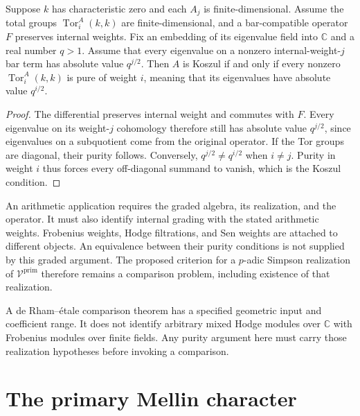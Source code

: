 \begin{theorem}
\label{v4-arith:thm:arithmetic-koszulness}
Suppose \(k\) has characteristic zero and each \(A_j\) is finite-dimensional.
Assume the total groups
\(\operatorname{Tor}^A_i(k,k)\) are finite-dimensional, and a
bar-compatible operator \(F\) preserves internal weights.
Fix an embedding of its eigenvalue field into \(\mathbb C\) and
a real number \(q>1\). Assume that every eigenvalue on a nonzero
internal-weight-\(j\) bar term has absolute value \(q^{j/2}\).
Then \(A\) is Koszul if and only if every nonzero
\(\operatorname{Tor}^A_i(k,k)\) is pure of weight \(i\), meaning
that its eigenvalues have absolute value \(q^{i/2}\).
\end{theorem}
\begin{proof}
The differential preserves internal weight and commutes with \(F\).
Every eigenvalue on its weight-\(j\) cohomology therefore still has
absolute value \(q^{j/2}\), since eigenvalues on a subquotient come
from the original operator. If the Tor groups are diagonal, their
purity follows. Conversely, \(q^{j/2}\ne q^{i/2}\) when \(i\ne j\).
Purity in weight \(i\) thus forces every off-diagonal summand to
vanish, which is the Koszul condition.
\end{proof}

An arithmetic application requires the graded algebra, its realization,
and the operator. It must also identify internal grading with the
stated arithmetic weights. Frobenius weights,
Hodge filtrations, and Sen weights are attached to different objects.
An equivalence between their purity conditions is not supplied by
this graded argument. The proposed criterion for a \(p\)-adic
Simpson realization of \(\mathcal V^{\mathrm{prim}}\) therefore
remains a comparison problem, including existence of that realization.

\begin{remark}
A de Rham--\'etale comparison theorem has a specified geometric
input and coefficient range. It does not identify arbitrary mixed
Hodge modules over \(\mathbb C\) with Frobenius modules over finite
fields. Any purity argument here must carry those realization
hypotheses before invoking a comparison.
\end{remark}

\section{The primary Mellin character}
\label{v4-arith:bar:heisenberg-zeta}

